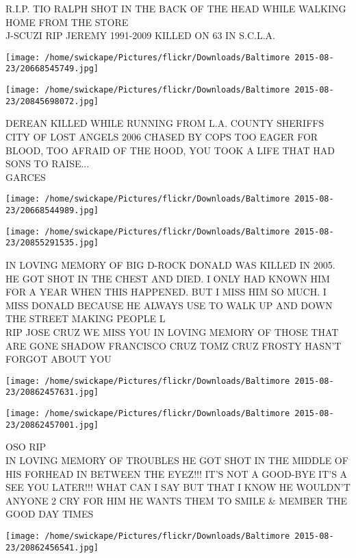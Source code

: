 \documentclass[10pt,letterpaper]{article}
\begin{document}
R.I.P. TIO RALPH SHOT IN THE BACK OF THE HEAD WHILE WALKING HOME FROM THE STORE\\
J{-}SCUZI RIP JEREMY 1991{-}2009 KILLED ON 63 IN S.C.L.A.
\pagebreak

\texttt{[image: /home/swickape/Pictures/flickr/Downloads/Baltimore 2015-08-23/20668545749.jpg]}

\vspace{0.25in}
\texttt{[image: /home/swickape/Pictures/flickr/Downloads/Baltimore 2015-08-23/20845698072.jpg]}

DEREAN KILLED WHILE RUNNING FROM L.A. COUNTY SHERIFFS CITY OF LOST ANGELS 2006 CHASED BY COPS TOO EAGER FOR BLOOD, TOO AFRAID OF THE HOOD, YOU TOOK A LIFE THAT HAD SONS TO RAISE...\\
GARCES
\pagebreak

\texttt{[image: /home/swickape/Pictures/flickr/Downloads/Baltimore 2015-08-23/20668544989.jpg]}

\vspace{0.25in}
\texttt{[image: /home/swickape/Pictures/flickr/Downloads/Baltimore 2015-08-23/20855291535.jpg]}

IN LOVING MEMORY OF BIG D{-}ROCK DONALD WAS KILLED IN 2005.  HE GOT SHOT IN THE CHEST AND DIED.  I ONLY HAD KNOWN HIM FOR A YEAR WHEN THIS HAPPENED.  BUT I MISS HIM SO MUCH.  I MISS DONALD BECAUSE HE ALWAYS USE TO WALK UP AND DOWN THE STREET MAKING PEOPLE L\\
RIP JOSE CRUZ WE MISS YOU IN LOVING MEMORY OF THOSE THAT ARE GONE SHADOW FRANCISCO CRUZ TOMZ CRUZ FROSTY HASN'T FORGOT ABOUT YOU
\pagebreak

\texttt{[image: /home/swickape/Pictures/flickr/Downloads/Baltimore 2015-08-23/20862457631.jpg]}

\vspace{0.25in}
\texttt{[image: /home/swickape/Pictures/flickr/Downloads/Baltimore 2015-08-23/20862457001.jpg]}

OSO RIP\\
IN LOVING MEMORY OF TROUBLES HE GOT SHOT IN THE MIDDLE OF HIS FORHEAD IN BETWEEN THE EYEZ!!! IT'S NOT A GOOD{-}BYE IT'S A SEE YOU LATER!!! WHAT CAN I SAY BUT THAT I KNOW HE WOULDN'T ANYONE 2 CRY FOR HIM HE WANTS THEM TO SMILE \& MEMBER THE GOOD DAY TIMES
\pagebreak

\texttt{[image: /home/swickape/Pictures/flickr/Downloads/Baltimore 2015-08-23/20862456541.jpg]}
\end{document}
